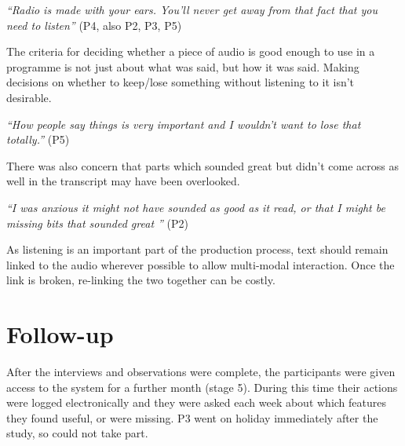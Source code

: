 \textit{``Radio is made with your ears. You'll never get away from that fact
  that you need to listen''} (P4, also P2, P3, P5)

The criteria for deciding whether a piece of audio is good enough to use in a
programme is not just about what was said, but how it was said. Making
decisions on whether to keep/lose something without listening to it isn't
desirable.

\textit{``How people say things is very important and I wouldn't want to lose
  that totally.''} (P5)

There was also concern that parts which sounded great but didn't come across
as well in the transcript may have been overlooked.

\textit{``I was anxious it might not have sounded as good as it read, or that I
  might be missing bits that sounded great ''} (P2)

As listening is an important part of the production process, text should remain
linked to the audio wherever possible to allow multi-modal interaction. Once
the link is broken, re-linking the two together can be costly.







\section{Follow-up}
After the interviews and observations were complete, the participants were given
access to the system for a further month (stage 5). During this time their
actions were logged electronically and they were asked each week about which
features they found useful, or were missing. P3 went on holiday immediately
after the study, so could not take part.

